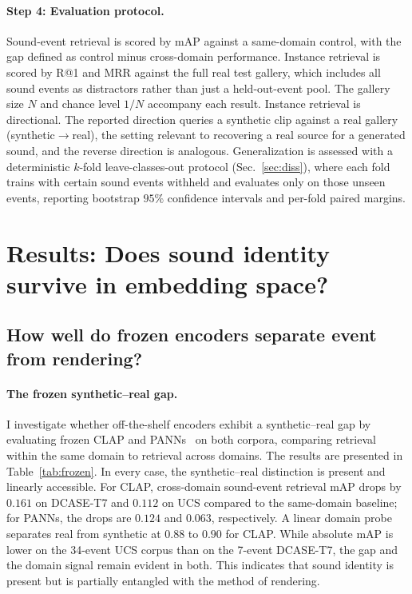 \documentclass{article}
\begin{document}
\paragraph{Step 4: Evaluation protocol.} Sound-event retrieval is scored by mAP against a same-domain control, with the gap defined as control minus cross-domain performance. Instance retrieval is scored by R@1 and MRR against the full real test gallery, which includes all sound events as distractors rather than just a held-out-event pool. The gallery size $N$ and chance level $1/N$ accompany each result. Instance retrieval is directional. The reported direction queries a synthetic clip against a real gallery (synthetic$\to$real), the setting relevant to recovering a real source for a generated sound, and the reverse direction is analogous. Generalization is assessed with a deterministic $k$-fold leave-classes-out protocol (Sec.~\ref{sec:diss}), where each fold trains with certain sound events withheld and evaluates only on those unseen events, reporting bootstrap $95\%$ confidence intervals and per-fold paired margins.

\section{Results: Does sound identity survive in embedding space?}
\label{sec:exp}

\subsection{How well do frozen encoders separate event from rendering?}
\paragraph{The frozen synthetic--real gap.} I investigate whether off-the-shelf encoders exhibit a synthetic--real gap by evaluating frozen CLAP and PANNs~\citep{kong2020panns} on both corpora, comparing retrieval within the same domain to retrieval across domains. The results are presented in Table~\ref{tab:frozen}. In every case, the synthetic--real distinction is present and linearly accessible. For CLAP, cross-domain sound-event retrieval mAP drops by $0.161$ on DCASE-T7 and $0.112$ on UCS compared to the same-domain baseline; for PANNs, the drops are $0.124$ and $0.063$, respectively. A linear domain probe separates real from synthetic at $0.88$ to $0.90$ for CLAP. While absolute mAP is lower on the 34-event UCS corpus than on the 7-event DCASE-T7, the gap and the domain signal remain evident in both. This indicates that sound identity is present but is partially entangled with the method of rendering.
\end{document}
